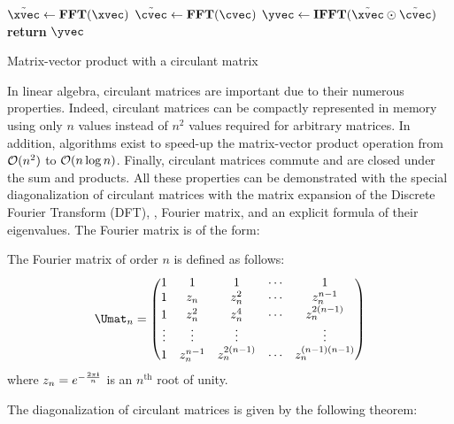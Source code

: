 \begin{algorithm}[htb]
  \begin{algorithmic}[1]
     
      \State $\tilde{\xvec} \gets \textbf{FFT}(\xvec)$
      \State $\tilde{\cvec} \gets \textbf{FFT}(\cvec)$
      \State $\yvec \gets \textbf{IFFT}(\tilde{\xvec} \odot \tilde{\cvec})$ 
      \State \textbf{return} $\yvec$ 
    \EndProcedure
  \end{algorithmic}
  \caption{Matrix-vector product with a circulant matrix}
  \label{algorithm:ch2-matrix_vector_product_circulant_matrix}
\end{algorithm}

In linear algebra, circulant matrices are important due to their numerous properties.
Indeed, circulant matrices can be compactly represented in memory using only $n$ values instead of $n^2$ values required for arbitrary matrices.
In addition, algorithms exist to speed-up the matrix-vector product operation from $\mathcal{O}(n^2)$ to $\mathcal{O}(n \log n)$. 
Finally, circulant matrices commute and are closed under the sum and products.
All these properties can be demonstrated with the special diagonalization of circulant matrices with the matrix expansion of the Discrete Fourier Transform (DFT), \ie, Fourier matrix, and an explicit formula of their eigenvalues.
The Fourier matrix is of the form:
\begin{definition}
  The Fourier matrix of order $n$ is defined as follows:
  \begin{equation} \label{definition:ch2-fourier_matrix}
    \Umat_n = 
    \leftmatrix
      1      & 1         & 1            & \cdots & 1                \\
      1      & z_n       & z_n^2        & \cdots & z_n^{n-1}        \\
      1      & z_n^2     & z_n^4        & \cdots & z_n^{2(n-1)}     \\
      \vdots & \vdots    & \vdots       &        & \vdots           \\
      1      & z_n^{n-1} & z_n^{2(n-1)} & \cdots & z_n^{(n-1)(n-1)}
    \rightmatrix
  \end{equation}
  where $z_n = e^{-\frac{2\pi\mathbf{i}}{n}}$ is an $n^{\text{th}}$ root of unity.
\end{definition}
\noindent
The diagonalization of circulant matrices is given by the following theorem:

